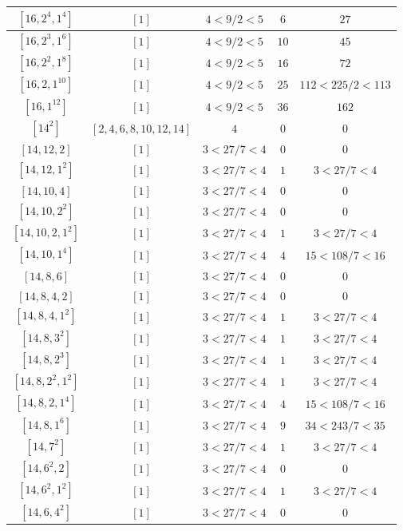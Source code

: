 \documentclass{article}%
\begin{document}
\begin{center}
\begin{longtable}{||c|c|c|c|c||}
$[16, 2^{4}, 1^{4}]$ & $[1]$ & $4 < 9/2 < 5$ & $6$ & $27$ \\ \hline 
$[16, 2^{3}, 1^{6}]$ & $[1]$ & $4 < 9/2 < 5$ & $10$ & $45$ \\ \hline 
$[16, 2^{2}, 1^{8}]$ & $[1]$ & $4 < 9/2 < 5$ & $16$ & $72$ \\ \hline 
$[16, 2, 1^{10}]$ & $[1]$ & $4 < 9/2 < 5$ & $25$ & $112 < 225/2 < 113$ \\ \hline 
$[16, 1^{12}]$ & $[1]$ & $4 < 9/2 < 5$ & $36$ & $162$ \\ \hline 
$[14^{2}]$ & $[2, 4, 6, 8, 10, 12, 14]$ & $4$ & $0$ & $0$ \\ \hline 
$[14, 12, 2]$ & $[1]$ & $3 < 27/7 < 4$ & $0$ & $0$ \\ \hline 
$[14, 12, 1^{2}]$ & $[1]$ & $3 < 27/7 < 4$ & $1$ & $3 < 27/7 < 4$ \\ \hline 
$[14, 10, 4]$ & $[1]$ & $3 < 27/7 < 4$ & $0$ & $0$ \\ \hline 
$[14, 10, 2^{2}]$ & $[1]$ & $3 < 27/7 < 4$ & $0$ & $0$ \\ \hline 
$[14, 10, 2, 1^{2}]$ & $[1]$ & $3 < 27/7 < 4$ & $1$ & $3 < 27/7 < 4$ \\ \hline 
$[14, 10, 1^{4}]$ & $[1]$ & $3 < 27/7 < 4$ & $4$ & $15 < 108/7 < 16$ \\ \hline 
$[14, 8, 6]$ & $[1]$ & $3 < 27/7 < 4$ & $0$ & $0$ \\ \hline 
$[14, 8, 4, 2]$ & $[1]$ & $3 < 27/7 < 4$ & $0$ & $0$ \\ \hline 
$[14, 8, 4, 1^{2}]$ & $[1]$ & $3 < 27/7 < 4$ & $1$ & $3 < 27/7 < 4$ \\ \hline 
$[14, 8, 3^{2}]$ & $[1]$ & $3 < 27/7 < 4$ & $1$ & $3 < 27/7 < 4$ \\ \hline 
$[14, 8, 2^{3}]$ & $[1]$ & $3 < 27/7 < 4$ & $1$ & $3 < 27/7 < 4$ \\ \hline 
$[14, 8, 2^{2}, 1^{2}]$ & $[1]$ & $3 < 27/7 < 4$ & $1$ & $3 < 27/7 < 4$ \\ \hline 
$[14, 8, 2, 1^{4}]$ & $[1]$ & $3 < 27/7 < 4$ & $4$ & $15 < 108/7 < 16$ \\ \hline 
$[14, 8, 1^{6}]$ & $[1]$ & $3 < 27/7 < 4$ & $9$ & $34 < 243/7 < 35$ \\ \hline 
$[14, 7^{2}]$ & $[1]$ & $3 < 27/7 < 4$ & $1$ & $3 < 27/7 < 4$ \\ \hline 
$[14, 6^{2}, 2]$ & $[1]$ & $3 < 27/7 < 4$ & $0$ & $0$ \\ \hline 
$[14, 6^{2}, 1^{2}]$ & $[1]$ & $3 < 27/7 < 4$ & $1$ & $3 < 27/7 < 4$ \\ \hline 
$[14, 6, 4^{2}]$ & $[1]$ & $3 < 27/7 < 4$ & $0$ & $0$ \\ \hline 

\end{longtable}
\end{center}
\end{document}

